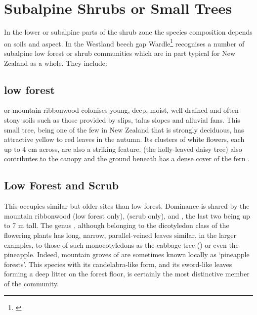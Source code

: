 \section{Subalpine Shrubs or Small Trees}

In the lower or subalpine parts of the shrub zone the species composition depends on soils and aspect.
In the Westland beech gap Wardle\footnote{\cite{wardle1977plant}} recognises a number of subalpine low forest or shrub communities which are in part typical for New Zealand as a whole.
They include:

\subsection[\emph{Hoheria glabrata} low forest]{ low forest}

 or mountain ribbonwood colonises young, deep, moist, well-drained and often stony soils such as those provided by slips, talus slopes and alluvial fans.
This small tree, being one of the few in New Zealand that is strongly deciduous, has attractive yellow to red leaves in the autumn.
Its clusters of white flowers, each up to 4 cm across, are also a striking feature.  (the holly-leaved daisy tree) also contributes to the canopy and the ground beneath has a dense cover of the fern .

\subsection[\emph{Dracophyllum-Olearia} Low Forest and Scrub]{ Low Forest and Scrub}

This occupies similar but older sites than  low forest.
Dominance is shared by the mountain ribbonwood (low forest only),  (scrub only),  and , the last two being up to 7 m tall.
The genus , although belonging to the dicotyledon class of the flowering plants has long, narrow, parallel-veined leaves similar, in the larger examples, to those of such monocotyledons as the cabbage tree () or even the pineapple.
Indeed, mountain groves of  are sometimes known locally as `pineapple forests'.
This species with its candelabra-like form, and its sword-like leaves forming a deep litter on the forest floor, is certainly the most distinctive member of the community.


